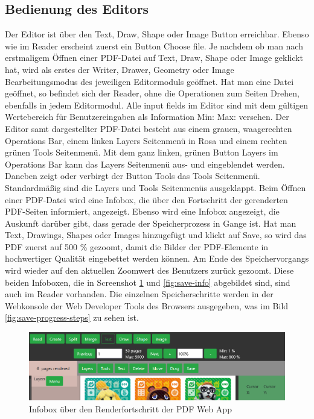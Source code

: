 \subsection{Bedienung des Editors}
Der Editor ist über den Text, Draw, Shape oder Image Button erreichbar. Ebenso wie im Reader erscheint zuerst ein Button Choose file. Je nachdem ob man nach erstmaligem Öffnen einer PDF-Datei auf Text, Draw, Shape oder Image geklickt hat, wird als erstes der Writer, Drawer, Geometry oder Image Bearbeitungsmodus des jeweiligen Editormoduls geöffnet. Hat man eine Datei geöffnet, so befindet sich der Reader, ohne die Operationen zum Seiten Drehen, ebenfalls in jedem Editormodul. Alle input fields im Editor sind mit dem gültigen Wertebereich für Benutzereingaben als Information Min: Max: versehen. Der Editor samt dargestellter PDF-Datei besteht aus einem grauen, waagerechten Operations Bar, einem linken Layers Seitenmenü in Rosa und einem rechten grünen Tools Seitenmenü. Mit dem ganz linken, grünen Button Layers im Operations Bar kann das Layers Seitenmenü aus- und eingeblendet werden. Daneben zeigt oder verbirgt der Button Tools das Tools Seitenmenü. Standardmäßig sind die Layers und Tools Seitenmenüs ausgeklappt. Beim Öffnen einer PDF-Datei wird eine Infobox, die über den Fortschritt der gerenderten PDF-Seiten informiert, angezeigt. Ebenso wird eine Infobox angezeigt, die Auskunft darüber gibt, dass gerade der Speicherprozess in Gange ist. Hat man Text, Drawings, Shapes oder Images hinzugefügt und klickt auf Save, so wird das PDF zuerst auf 500 \% gezoomt, damit die Bilder der PDF-Elemente in hochwertiger Qualität eingebettet werden können. Am Ende des Speichervorgangs wird wieder auf den aktuellen Zoomwert des Benutzers zurück gezoomt. Diese beiden Infoboxen, die in Screenshot \ref{fig:render-info} und \ref{fig:save-info} abgebildet sind, sind auch im Reader vorhanden. Die einzelnen Speicherschritte werden in der Webkonsole der Web Developer Tools des Browsers ausgegeben, was im Bild \ref{fig:save-progress-steps} zu sehen ist.

\begin{figure}[!htbp]
	\centering
	\includegraphics[width=1\textwidth]{"images/render-info.png"}
	\caption{Infobox über den Renderfortschritt der PDF Web App}
	\label{fig:render-info}
\end{figure}

